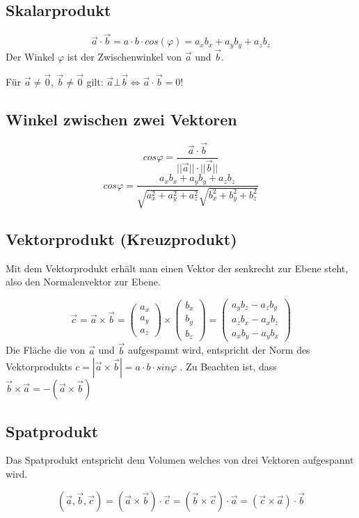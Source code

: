 \subsection{Skalarprodukt}
\[ \boxed{ \vec{a} \cdot \vec{b} = a \cdot b \cdot cos(\varphi) = a_x b_x + a_y b_y + a_z b_z } \]
Der Winkel $\varphi$ ist der Zwischenwinkel von $\vec{a}$ und $\vec{b}$.

\noindent
Für $\vec{a} \neq \vec{0}$, $\vec{b} \neq \vec{0}$ gilt: $\vec{a} \bot \vec{b} \Leftrightarrow \vec{a} \cdot \vec{b} = 0$!

\subsection{Winkel zwischen zwei Vektoren}
\[ \boxed{ cos \varphi = \frac{\vec{a} \cdot \vec{b} }{||\vec{a}|| \cdot ||\vec{b}||} } \]
\[ \boxed{ cos \varphi = \frac{a_x b_x + a_y b_y + a_z b_z}{ \sqrt{a_x^2 + a_y^2 + a_z^2} \sqrt{b_x^2 + b_y^2 + b_z^2} } } \]

\subsection{Vektorprodukt (Kreuzprodukt)}
Mit dem Vektorprodukt erhält man einen Vektor der senkrecht zur Ebene steht, also den Normalenvektor zur Ebene.

\[ \boxed{ \vec{c} = \vec{a} \times \vec{b} = 
\left( 
	  \begin{array}{ccc} 
	    a_x \\ a_y \\ a_z
	  \end{array}
	\right)
	\times
	\left( 
	  \begin{array}{ccc} 
	    b_x \\ b_y \\ b_z
	  \end{array}
	\right)
	=
	\left( 
	  \begin{array}{ccc} 
	    a_y b_z - a_z b_y \\ a_z b_x - a_x b_z \\ a_x b_y - a_y b_x
	  \end{array}
	\right)
} \]
\noindent
Die Fläche die von $\vec{a}$ und $\vec{b}$ aufgespannt wird, entspricht der Norm des Vektorprodukts $c=|\vec{a}\times\vec{b}| = a \cdot b \cdot sin \varphi$ .
Zu Beachten ist, dass $\vec{b} \times \vec{a} = -(\vec{a} \times \vec{b}) $

\subsection{Spatprodukt}
Das Spatprodukt entspricht dem Volumen welches von drei Vektoren aufgespannt wird.

\[ \boxed{ (\vec{a},\vec{b},\vec{c}) = (\vec{a} \times \vec{b}) \cdot \vec{c} = (\vec{b} \times \vec{c}) \cdot \vec{a} = (\vec{c} \times \vec{a}) \cdot \vec{b} } \]
